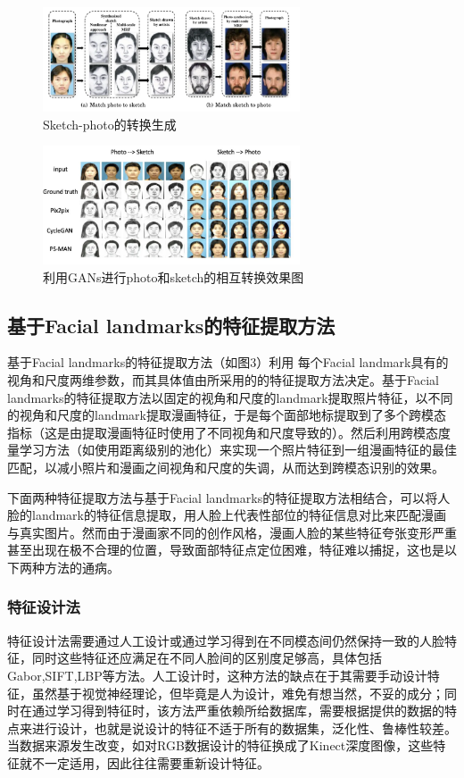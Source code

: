 \documentclass[12pt]{article}
\begin{document}
\begin{sloppypar}
\begin{multicols*}{2}
\begin{figure}[H]
	\centering
	\includegraphics[width=3in]{sections/figs/s-p.png}
	\caption{\label{fig2.11} \xiaowuhao \hei Sketch-photo的转换生成}
\end{figure}
\begin{figure}[H]
	\centering
	\includegraphics[width=3in]{sections/figs/gans.png}
	\caption{\label{fig2.11} \xiaowuhao \hei 利用GANs进行photo和sketch的相互转换效果图}
\end{figure}
\subsection{基于Facial landmarks的特征提取方法}
基于Facial landmarks的特征提取方法（如图3）利用
每个Facial landmark具有的视角和尺度两维参数，而其具体值由所采用的的特征提取方法决定。基于Facial landmarks的特征提取方法以固定的视角和尺度的landmark提取照片特征，以不同的视角和尺度的landmark提取漫画特征，于是每个面部地标提取到了多个跨模态指标（这是由提取漫画特征时使用了不同视角和尺度导致的）。然后利用跨模态度量学习方法（如使用距离级别的池化）来实现一个照片特征到一组漫画特征的最佳匹配，以减小照片和漫画之间视角和尺度的失调，从而达到跨模态识别的效果。
\par 下面两种特征提取方法与基于Facial landmarks的特征提取方法相结合，可以将人脸的landmark的特征信息提取，用人脸上代表性部位的特征信息对比来匹配漫画与真实图片。然而由于漫画家不同的创作风格，漫画人脸的某些特征夸张变形严重甚至出现在极不合理的位置，导致面部特征点定位困难，特征难以捕捉，这也是以下两种方法的通病。
\subsubsection{特征设计法}
特征设计法需要通过人工设计或通过学习得到在不同模态间仍然保持一致的人脸特征，同时这些特征还应满足在不同人脸间的区别度足够高，具体包括Gabor,SIFT,LBP等方法。人工设计时，这种方法的缺点在于其需要手动设计特征，虽然基于视觉神经理论，但毕竟是人为设计，难免有想当然，不妥的成分；同时在通过学习得到特征时，该方法严重依赖所给数据库，需要根据提供的数据的特点来进行设计，也就是说设计的特征不适于所有的数据集，泛化性、鲁棒性较差。当数据来源发生改变，如对RGB数据设计的特征换成了Kinect深度图像，这些特征就不一定适用，因此往往需要重新设计特征。

\end{multicols*}
\end{sloppypar}
\end{document}
